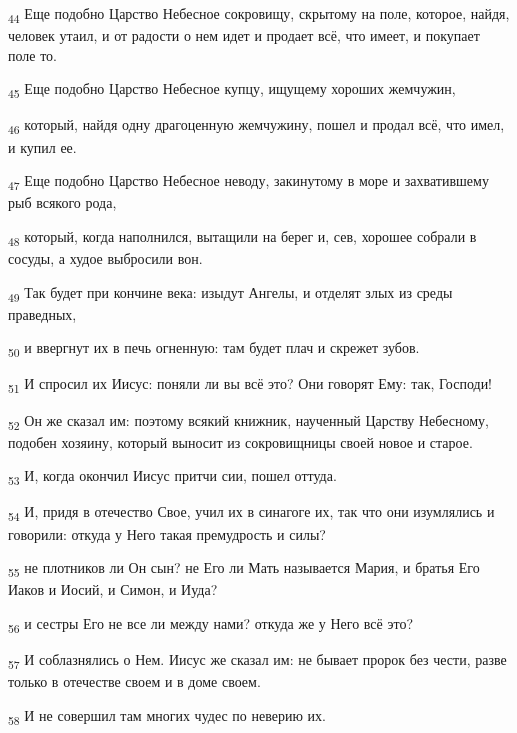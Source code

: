 \begin{tcolorbox}
\textsubscript{44} Еще подобно Царство Небесное сокровищу, скрытому на поле, которое, найдя, человек утаил, и от радости о нем идет и продает всё, что имеет, и покупает поле то.
\end{tcolorbox}
\begin{tcolorbox}
\textsubscript{45} Еще подобно Царство Небесное купцу, ищущему хороших жемчужин,
\end{tcolorbox}
\begin{tcolorbox}
\textsubscript{46} который, найдя одну драгоценную жемчужину, пошел и продал всё, что имел, и купил ее.
\end{tcolorbox}
\begin{tcolorbox}
\textsubscript{47} Еще подобно Царство Небесное неводу, закинутому в море и захватившему рыб всякого рода,
\end{tcolorbox}
\begin{tcolorbox}
\textsubscript{48} который, когда наполнился, вытащили на берег и, сев, хорошее собрали в сосуды, а худое выбросили вон.
\end{tcolorbox}
\begin{tcolorbox}
\textsubscript{49} Так будет при кончине века: изыдут Ангелы, и отделят злых из среды праведных,
\end{tcolorbox}
\begin{tcolorbox}
\textsubscript{50} и ввергнут их в печь огненную: там будет плач и скрежет зубов.
\end{tcolorbox}
\begin{tcolorbox}
\textsubscript{51} И спросил их Иисус: поняли ли вы всё это? Они говорят Ему: так, Господи!
\end{tcolorbox}
\begin{tcolorbox}
\textsubscript{52} Он же сказал им: поэтому всякий книжник, наученный Царству Небесному, подобен хозяину, который выносит из сокровищницы своей новое и старое.
\end{tcolorbox}
\begin{tcolorbox}
\textsubscript{53} И, когда окончил Иисус притчи сии, пошел оттуда.
\end{tcolorbox}
\begin{tcolorbox}
\textsubscript{54} И, придя в отечество Свое, учил их в синагоге их, так что они изумлялись и говорили: откуда у Него такая премудрость и силы?
\end{tcolorbox}
\begin{tcolorbox}
\textsubscript{55} не плотников ли Он сын? не Его ли Мать называется Мария, и братья Его Иаков и Иосий, и Симон, и Иуда?
\end{tcolorbox}
\begin{tcolorbox}
\textsubscript{56} и сестры Его не все ли между нами? откуда же у Него всё это?
\end{tcolorbox}
\begin{tcolorbox}
\textsubscript{57} И соблазнялись о Нем. Иисус же сказал им: не бывает пророк без чести, разве только в отечестве своем и в доме своем.
\end{tcolorbox}
\begin{tcolorbox}
\textsubscript{58} И не совершил там многих чудес по неверию их.
\end{tcolorbox}
